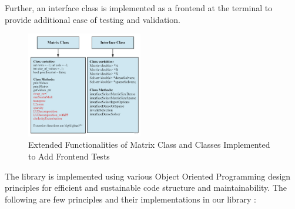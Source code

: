 \documentclass[twoside,twocolumn]{article}
\begin{document}
Further, an interface class is implemented as a frontend at the terminal to provide additional ease of testing and validation.
\begin{figure}[H]
\centering
\includegraphics[width=0.45\textwidth]{images/Interface.jpg}
\caption{Extended Functionalities of Matrix Class and Classes Implemented to Add Frontend Tests}
\end{figure}
The library is implemented using various Object Oriented Programming design principles for efficient and sustainable code structure and maintainability. The following are few principles and their implementations in our library :
\end{document}
